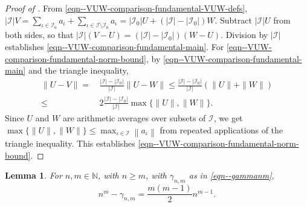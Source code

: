 \documentclass[12pt]{article}
\numberwithin{equation}{section}
\theoremstyle{definition}
\theoremstyle{plain}
\newtheorem{lemma}{Lemma}[section]
\begin{document}
\begin{proof}[Proof of ]
From \eqref{eqn--VUW-comparison-fundamental-VUW-defs},
\(|\mathcal{I}| V = \sum_{\iota \in \mathcal{I}_{0}} a_{\iota} + \sum_{\iota \in
\mathcal{I} \setminus \mathcal{I}_{0}} a_{\iota} = \left| \mathcal{I}_{0}
\right| U + \left( |\mathcal{I}| - \left| \mathcal{I}_{0} \right| \right) W\).
Subtract \(|\mathcal{I}| U\) from both sides, so that \(|\mathcal{I}| (V - U) =
\left( |\mathcal{I}| - \left| \mathcal{I}_{0} \right| \right) (W - U)\).
Division by \(|\mathcal{I}|\) establishes
\eqref{eqn--VUW-comparison-fundamental-main}.
For \eqref{eqn--VUW-comparison-fundamental-norm-bound}, by
\eqref{eqn--VUW-comparison-fundamental-main} and the triangle inequality,
\begin{align*}
  \|U - V\| =
  & \, \frac{|\mathcal{I}| - \left| \mathcal{I}_{0}
  \right|}{|\mathcal{I}|} \|U - W\| \leq \frac{|\mathcal{I}| - \left|
  \mathcal{I}_{0} \right|}{|\mathcal{I}|} (\|U\| + \|W\|) \\
  \leq
  & \, 2 \frac{|\mathcal{I}| - \left| \mathcal{I}_{0} \right|}{|\mathcal{I}|}
  \max \{\|U\|, \|W\|\}.
\end{align*}
Since \(U\) and \(W\) are arithmetic averages over subsets of \(\mathcal{I}\),
we get \(\max \{\|U\|, \|W\|\} \leq \max_{\iota \in \mathcal{I}} \left\|
a_{\iota} \right\|\) from repeated applications of the triangle inequality.
This establishes \eqref{eqn--VUW-comparison-fundamental-norm-bound}.
\end{proof}

\begin{lemma}
\label{lem--nm-gammanm}
For \(n, m \in \mathbb{N}\), with \(n \geq m\), with \(\gamma_{n, m}\) as in
\eqref{eqn--gammanm},
\begin{equation}
  n^{m} - \gamma_{n, m} = \frac{m (m - 1)}{2} n^{m - 1}.
  \label{eqn--nm-gammanm}
\end{equation}
\end{lemma}
\end{document}
